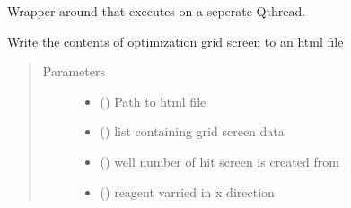 \documentclass[letterpaper,10pt,english]{sphinxmanual}
\begin{document}
\begin{fulllineitems}
\begin{fulllineitems}
\label{\detokenize{polo.utils:polo.utils.io_utils.HtmlWriter.write_complete_run_on_thread}}
Wrapper around  that executes on a seperate
Qthread.

\end{fulllineitems}


\begin{fulllineitems}
\label{\detokenize{polo.utils:polo.utils.io_utils.HtmlWriter.write_grid_screen}}
Write the contents of optimization grid screen to an html file
\begin{quote}\begin{description}
\item[{Parameters}] \leavevmode\begin{itemize}
\item {} 
 () \textendash{} Path to html file

\item {} 
 () \textendash{} list containing grid screen data

\item {} 
 () \textendash{} well number of hit screen is created from

\item {} 
 ({\hyperref[\detokenize{polo.crystallography:polo.crystallography.cocktail.Reagent}]{}}) \textendash{} reagent varried in x direction


\end{itemize}
\end{description}
\end{quote}
\end{fulllineitems}
\end{fulllineitems}
\end{document}
